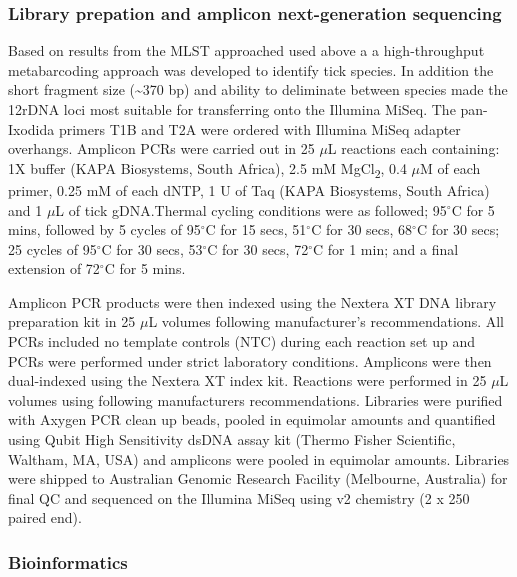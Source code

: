 \documentclass[a4paper, nobind]{templates/ociamthesis}
\begin{document}
\hypertarget{library-prepation-and-amplicon-next-generation-sequencing}{%
\subsubsection{Library prepation and amplicon next-generation sequencing}\label{library-prepation-and-amplicon-next-generation-sequencing}}

Based on results from the MLST approached used above a a high-throughput metabarcoding approach was developed to identify tick species.
In addition the short fragment size (\textasciitilde370 bp) and ability to deliminate between species made the 12rDNA loci most suitable for transferring onto the Illumina MiSeq.
The pan-Ixodida primers T1B and T2A \autocite{beatiAnalysisSystematicRelationships2001} were ordered with Illumina MiSeq adapter overhangs.
Amplicon PCRs were carried out in 25 \(\mu\)L reactions each containing: 1X buffer (KAPA Biosystems, South Africa), 2.5 mM MgCl\textsubscript{2}, 0.4 \(\mu\)M of each primer, 0.25 mM of each dNTP, 1 U of Taq (KAPA Biosystems, South Africa) and 1 \(\mu\)L of tick gDNA.Thermal cycling conditions were as followed; 95\(^\circ\)C for 5 mins, followed by 5 cycles of 95\(^\circ\)C for 15 secs, 51\(^\circ\)C for 30 secs, 68\(^\circ\)C for 30 secs; 25 cycles of 95\(^\circ\)C for 30 secs, 53\(^\circ\)C for 30 secs, 72\(^\circ\)C for 1 min; and a final extension of 72\(^\circ\)C for 5 mins.

Amplicon PCR products were then indexed using the Nextera XT DNA library preparation kit in 25 \(\mu\)L volumes following manufacturer's recommendations.
All PCRs included no template controls (NTC) during each reaction set up and PCRs were performed under strict laboratory conditions. Amplicons were then dual-indexed using the Nextera XT index kit.
Reactions were performed in 25 \(\mu\)L volumes using following manufacturers recommendations.
Libraries were purified with Axygen PCR clean up beads, pooled in equimolar amounts and quantified using Qubit High Sensitivity dsDNA assay kit (Thermo Fisher Scientific, Waltham, MA, USA) and amplicons were pooled in equimolar amounts.
Libraries were shipped to Australian Genomic Research Facility (Melbourne, Australia) for final QC and sequenced on the Illumina MiSeq using v2 chemistry (2 x 250 paired end).

\hypertarget{bioinformatics-1}{%
\subsubsection{Bioinformatics}\label{bioinformatics-1}}
\end{document}
